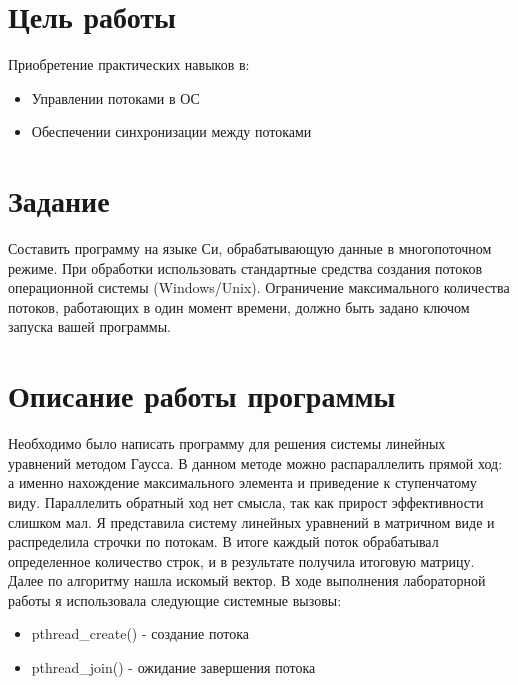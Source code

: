 \documentclass[a4paper, 12pt]{article}
\begin{document}
\section{Цель работы}
Приобретение практических навыков в:
\begin{itemize}
  \item Управлении потоками в ОС
  \item Обеспечении синхронизации между потоками
\end{itemize}

\section{Задание}
Составить программу на языке Си, обрабатывающую данные в многопоточном режиме. При обработки использовать стандартные средства создания потоков операционной системы (Windows/Unix). Ограничение максимального количества потоков, работающих в один момент времени, должно быть задано ключом запуска вашей программы.

\section{Описание работы программы}
Необходимо было написать программу для решения системы линейных уравнений методом Гаусса. В данном методе можно распараллелить прямой ход: а именно нахождение максимального элемента и приведение к ступенчатому виду. Параллелить обратный ход нет смысла, так как прирост эффективности слишком мал. Я представила систему линейных уравнений в матричном виде и распределила строчки по потокам. В итоге каждый поток обрабатывал определенное количество строк, и в результате получила итоговую матрицу. Далее по алгоритму нашла искомый вектор.
В ходе выполнения лабораторной работы я использовала следующие системные вызовы:
\begin{itemize}
  \item pthread\_create() - создание потока
  \item pthread\_join() - ожидание завершения потока
\end{itemize}

\newpage
\end{document}
